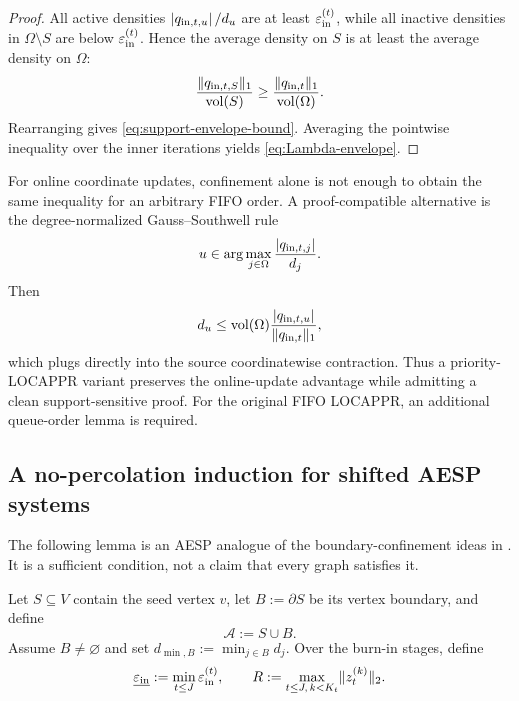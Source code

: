\begin{proof}
All active densities $\left\lvert q_{\mathrm{in},t,u} \right\rvert/d_u$ are at least
$\varepsilon_{\mathrm{in}}^{(t)}$, while all inactive densities in $\Omega\setminus S$ are below
$\varepsilon_{\mathrm{in}}^{(t)}$.
Hence the average
density on $S$ is at least the average density on $\Omega$:
\[
  \frac{\lVert q_{\mathrm{in},t,S}\rVert_1}{\operatorname{vol}(S)}
  \geq
  \frac{\lVert q_{\mathrm{in},t}\rVert_1}{\operatorname{vol}(\Omega)}.
\]
Rearranging gives \cref{eq:support-envelope-bound}.  Averaging the pointwise
inequality over the inner iterations yields \cref{eq:Lambda-envelope}.
\end{proof}

For online coordinate updates, confinement alone is not enough to obtain the
same inequality for an arbitrary FIFO order.  A proof-compatible alternative
is the degree-normalized Gauss--Southwell rule
\begin{equation}
  u\in\arg\max_{j\in\Omega}
    \frac{\left\lvert q_{\mathrm{in},t,j} \right\rvert}{d_j}.
  \label{eq:priority-rule}
\end{equation}
Then
\begin{equation}
  d_u
  \leq
  \operatorname{vol}(\Omega)\frac{\left\lvert q_{\mathrm{in},t,u} \right\rvert}
                       {\lVert q_{\mathrm{in},t}\rVert_1},
  \label{eq:priority-amortization}
\end{equation}
which plugs directly into the source coordinatewise contraction.  Thus a
priority-LOCAPPR variant preserves the online-update advantage while admitting
a clean support-sensitive proof.  For the original FIFO LOCAPPR, an additional
queue-order lemma is required.

\subsection{A no-percolation induction for shifted AESP systems}

The following lemma is an AESP analogue of the boundary-confinement ideas in
\citet{fountoulakis2026complexity}.  It is a sufficient condition, not a claim
that every graph satisfies it.

Let $S\subseteq V$ contain the seed vertex $v$, let
$B:=\partial S$ be its vertex boundary, and define
\begin{equation}
  \mathcal A:=S\cup B.
  \label{eq:core-boundary}
\end{equation}
Assume $B\neq\varnothing$ and set
$d_{\min,B}:=\min_{j\in B}d_j$.  Over the burn-in stages, define
\begin{equation}
  \underline{\varepsilon_{\mathrm{in}}}
  :=\min_{t\leq J}\varepsilon_{\mathrm{in}}^{(t)},
  \qquad
  R:=\max_{t\leq J,\,k<K_t}\lVert z_t^{(k)}\rVert_2.
  \label{eq:no-perc-parameters}
\end{equation}

